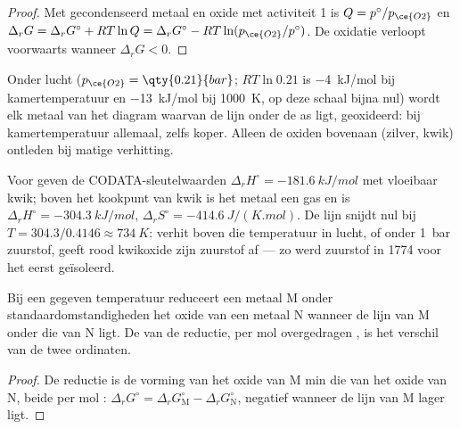 \begin{proof}
Met gecondenseerd metaal en oxide met activiteit 1 is $Q = p^\circ/p_{\ce{O2}}$ en
$\Delta_r G = \Delta_r G^\circ + RT\ln Q = \Delta_r G^\circ - RT\ln(p_{\ce{O2}}/
p^\circ)$. De oxidatie verloopt voorwaarts wanneer $\Delta_r G < 0$.
\end{proof}

Onder lucht ($p_{\ce{O2}} = \qty{0.21}{bar}$; $RT\ln 0.21$ is \qty{-4}{kJ/mol}
bij kamertemperatuur en \qty{-13}{kJ/mol} bij \qty{1000}{K}, op deze
schaal bijna nul) wordt elk metaal van het diagram waarvan de lijn
onder de as ligt, geoxideerd: bij kamertemperatuur allemaal, zelfs koper.
Alleen de oxiden bovenaan (zilver, kwik) ontleden bij matige
verhitting.

\begin{example}\label{ex:b2:ellingham:hgo}
Voor  geven de CODATA-sleutelwaarden $\Delta_r H^\circ =
\qty{-181.6}{kJ/mol}$ met vloeibaar kwik; boven het kookpunt van kwik
is het metaal een gas en is $\Delta_r H^\circ = \qty{-304.3}{kJ/mol}$, $\Delta_r
S^\circ = \qty{-414.6}{J/(K.mol)}$. De lijn snijdt nul bij
$T = 304.3/0.4146 \approx \qty{734}{K}$: verhit boven die temperatuur in lucht,
of onder \qty{1}{bar} zuurstof, geeft rood kwikoxide zijn zuurstof af ---
zo werd zuurstof in 1774 voor het eerst geïsoleerd.
\end{example}

\begin{proposition}\label{prop:b2:ellingham:reduction}
Bij een gegeven temperatuur reduceert een metaal M onder standaardomstandigheden het
oxide van een metaal N wanneer de lijn van M onder die van N ligt. De
 van de reductie, per mol overgedragen , is het
verschil van de twee ordinaten.
\end{proposition}

\begin{proof}
De reductie is de vorming van het oxide van M min die van het oxide van N, beide per
mol : $\Delta_r G^\circ = \Delta_r G^\circ_{\mathrm M} - \Delta_r
G^\circ_{\mathrm N}$, negatief wanneer de lijn van M lager ligt.
\end{proof}


